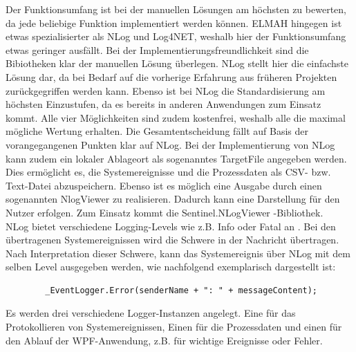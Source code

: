 \documentclass[ a4paper,
                oneside,
                toc=bibliography,
                toc=listof
                ]{scrbook}
\begin{document}
   	Der Funktionsumfang ist bei der manuellen Lösungen am höchsten zu bewerten, da jede beliebige Funktion implementiert werden können. ELMAH hingegen ist etwas spezialisierter als NLog und Log4NET, weshalb hier der Funktionsumfang etwas geringer ausfällt. Bei der Implementierungsfreundlichkeit sind die Bibiotheken klar der manuellen Lösung überlegen. NLog stellt hier die einfachste Lösung dar, da bei Bedarf auf die vorherige Erfahrung aus früheren Projekten zurückgegriffen werden kann. Ebenso ist bei NLog die Standardisierung am höchsten Einzustufen, da es bereits in anderen Anwendungen zum Einsatz kommt. Alle vier Möglichkeiten sind zudem kostenfrei, weshalb alle die maximal mögliche Wertung erhalten. Die Gesamtentscheidung fällt auf Basis der vorangegangenen Punkten klar auf NLog.
   	Bei der Implementierung von NLog kann zudem ein lokaler Ablageort als sogenanntes TargetFile angegeben werden. Dies ermöglicht es, die Systemereignisse und die Prozessdaten als CSV- bzw. Text-Datei abzuspeichern. Ebenso ist es möglich eine Ausgabe durch einen sogenannten NlogViewer zu realisieren. Dadurch kann eine Darstellung für den Nutzer erfolgen. Zum Einsatz kommt die \glqq Sentinel.NLogViewer \grqq{}-Bibliothek.\\
   	NLog bietet verschiedene \glqq Logging-Levels \grqq{} wie z.B. Info oder Fatal an \cite{nlog}. Bei den übertragenen Systemereignissen wird die Schwere in der Nachricht übertragen. Nach Interpretation dieser Schwere, kann das Systemereignis über NLog mit dem selben Level ausgegeben werden, wie nachfolgend exemplarisch dargestellt ist:
   	\begin{lstlisting}
   		_EventLogger.Error(senderName + ": " + messageContent);
   	\end{lstlisting}
   	Es werden drei verschiedene Logger-Instanzen angelegt. Eine für das Protokollieren von Systemereignissen, Einen für die Prozessdaten und einen für den Ablauf der WPF-Anwendung, z.B. für wichtige Ereignisse oder Fehler.
\end{document}

